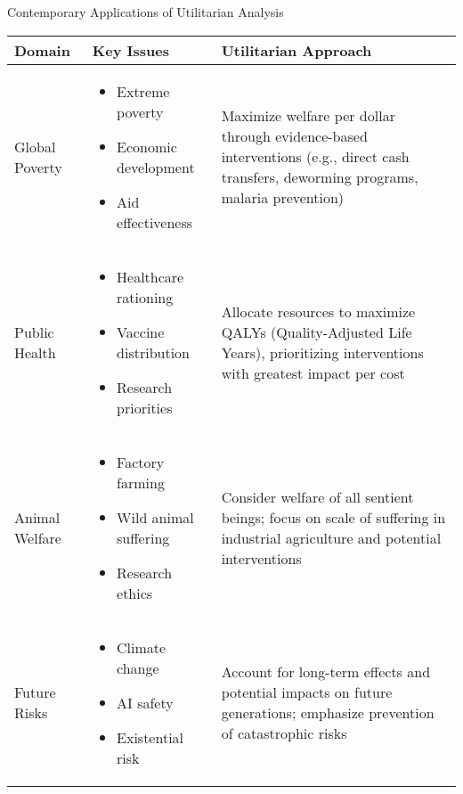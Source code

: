 \documentclass[aspectratio=169]{beamer}
\begin{document}
\begin{frame}{Contemporary Applications of Utilitarian Analysis}
    \begin{table}[]
        \scriptsize
        \begin{tabular}{p{2.2cm}p{3.5cm}p{3.5cm}}
            \textbf{Domain} & \textbf{Key Issues} & \textbf{Utilitarian Approach} \\\hline
            
            Global Poverty & \begin{itemize}\setlength\itemsep{0em}
                \item Extreme poverty
                \item Economic development
                \item Aid effectiveness
            \end{itemize} & 
            Maximize welfare per dollar through evidence-based interventions (e.g., direct cash transfers, deworming programs, malaria prevention) \\\hline
            
            Public Health & \begin{itemize}\setlength\itemsep{0em}
                \item Healthcare rationing
                \item Vaccine distribution
                \item Research priorities
            \end{itemize} & 
            Allocate resources to maximize QALYs (Quality-Adjusted Life Years), prioritizing interventions with greatest impact per cost \\\hline
            
            Animal Welfare & \begin{itemize}\setlength\itemsep{0em}
                \item Factory farming
                \item Wild animal suffering
                \item Research ethics
            \end{itemize} & 
            Consider welfare of all sentient beings; focus on scale of suffering in industrial agriculture and potential interventions \\\hline
            
            Future Risks & \begin{itemize}\setlength\itemsep{0em}
                \item Climate change
                \item AI safety
                \item Existential risk
            \end{itemize} & 
            Account for long-term effects and potential impacts on future generations; emphasize prevention of catastrophic risks \\\hline
            

\end{tabular}
\end{table}
\end{frame}
\end{document}
